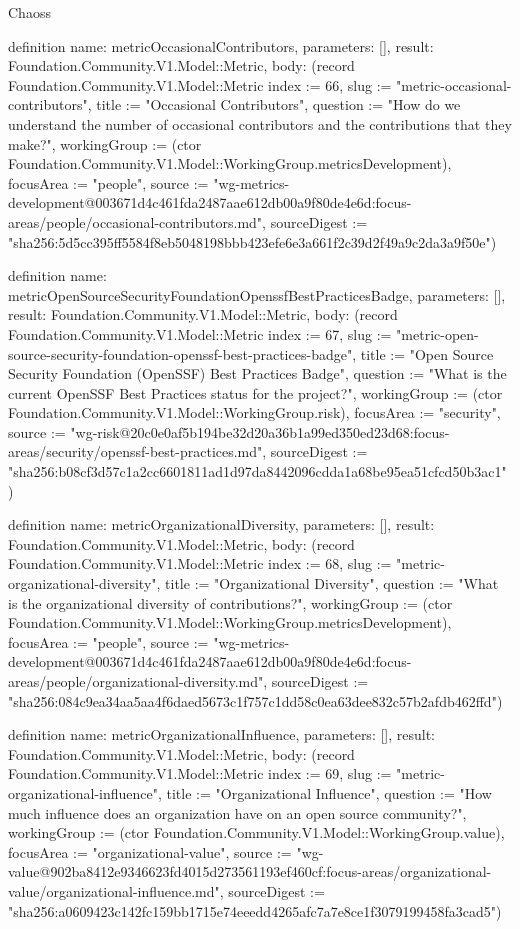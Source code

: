 \begin{lexlean}{Chaoss}
\begin{semanticmodule}
definition{
  name: metricOccasionalContributors,
  parameters: [],
  result: Foundation.Community.V1.Model::Metric,
  body: (record Foundation.Community.V1.Model::Metric {index := 66, slug := "metric-occasional-contributors", title := "Occasional Contributors", question := "How do we understand the number of occasional contributors and the contributions that they make?", workingGroup := (ctor Foundation.Community.V1.Model::WorkingGroup.metricsDevelopment), focusArea := "people", source := "wg-metrics-development@003671d4c461fda2487aae612db00a9f80de4e6d:focus-areas/people/occasional-contributors.md", sourceDigest := "sha256:5d5cc395ff5584f8eb5048198bbb423efe6e3a661f2c39d2f49a9c2da3a9f50e"})
}

definition{
  name: metricOpenSourceSecurityFoundationOpenssfBestPracticesBadge,
  parameters: [],
  result: Foundation.Community.V1.Model::Metric,
  body: (record Foundation.Community.V1.Model::Metric {index := 67, slug := "metric-open-source-security-foundation-openssf-best-practices-badge", title := "Open Source Security Foundation (OpenSSF) Best Practices Badge", question := "What is the current OpenSSF Best Practices status for the project?", workingGroup := (ctor Foundation.Community.V1.Model::WorkingGroup.risk), focusArea := "security", source := "wg-risk@20c0e0af5b194be32d20a36b1a99ed350ed23d68:focus-areas/security/openssf-best-practices.md", sourceDigest := "sha256:b08cf3d57c1a2cc6601811ad1d97da8442096cdda1a68be95ea51cfcd50b3ac1"})
}

definition{
  name: metricOrganizationalDiversity,
  parameters: [],
  result: Foundation.Community.V1.Model::Metric,
  body: (record Foundation.Community.V1.Model::Metric {index := 68, slug := "metric-organizational-diversity", title := "Organizational Diversity", question := "What is the organizational diversity of contributions?", workingGroup := (ctor Foundation.Community.V1.Model::WorkingGroup.metricsDevelopment), focusArea := "people", source := "wg-metrics-development@003671d4c461fda2487aae612db00a9f80de4e6d:focus-areas/people/organizational-diversity.md", sourceDigest := "sha256:084c9ea34aa5aa4f6daed5673c1f757c1dd58c0ea63dee832c57b2afdb462ffd"})
}

definition{
  name: metricOrganizationalInfluence,
  parameters: [],
  result: Foundation.Community.V1.Model::Metric,
  body: (record Foundation.Community.V1.Model::Metric {index := 69, slug := "metric-organizational-influence", title := "Organizational Influence", question := "How much influence does an organization have on an open source community?", workingGroup := (ctor Foundation.Community.V1.Model::WorkingGroup.value), focusArea := "organizational-value", source := "wg-value@902ba8412e9346623fd4015d273561193ef460cf:focus-areas/organizational-value/organizational-influence.md", sourceDigest := "sha256:a0609423c142fc159bb1715e74eeedd4265afc7a7e8ce1f3079199458fa3cad5"})
}


\end{semanticmodule}
\end{lexlean}
